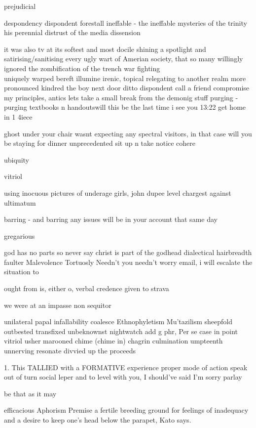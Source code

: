 
prejudicial



despondency
dispondent
forestall
ineffable - the ineffable mysteries of the trinity
his perennial distrust of the media
dissension

it was also tv at its softest and most docile
shining a spotlight and satirising/sanitising every ugly wart of Amerian society, that so many willingly ignored
the zombification of the
trench war fighting\\
uniquely warped
bereft illumine irenic, topical relegating to another realm
more pronounced
kindred
the boy next door
ditto
dispondent
call a friend
compromise my principles, antics
lets take a small break from the demonig stuff
purging - purging textbooks n handoutswill this be the last time i see you
13:22
get home in 1 4iece


ghost under your chair
wasnt expecting any spectral visitors, in that case will you be staying for dinner
unprecedented
sit up n take notice
cohere

ubiquity

vitriol

using inocuous pictures of underage girls, john dupee
level chargest against
ultimatum

barring - and barring any issues will be in your account that same day

gregarious

god has no parts so never say christ is part of the godhead
dialectical
hairbreadth
faulter
Malevolence
Tortuosly
Needn't you needn't worry
email, i will escalate the situation to

ought from is, either o, verbal credence given to
strava

we were at an impasse
non sequitor

unilateral papal infallability
coalesce
Ethnophyletism
Mu'tazilism
sheepfold
outbested
transfixed
unbeknownst
nightwatch
add g phr,
Per se
case in point
vitriol
usher
marooned
chime (chime in)
chagrin
culmination
umpteenth
unnerving
resonate
divvied up the proceeds

1. This TALLIED with a FORMATIVE experience
proper mode of action
speak out of turn
social leper
and to level with you, I should've said I'm sorry
parlay

be that as it may

efficacious
Aphorism
Premise
 a fertile breeding ground for feelings of inadequacy and a desire to keep one’s head below the parapet, Kato says.





